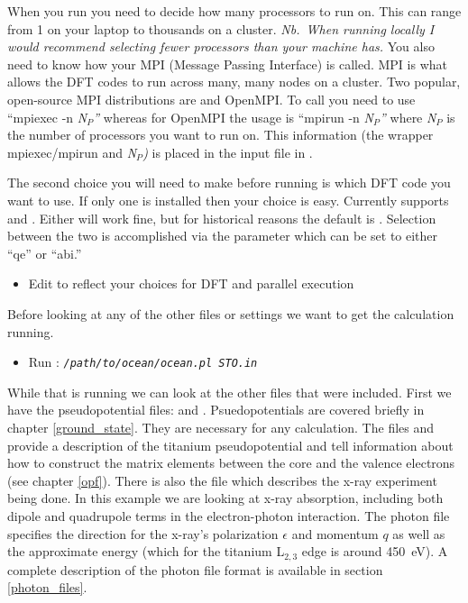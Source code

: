 \documentclass[11pt]{report}
\begin{document}
When you run  you need to decide how many processors to run on. This can range from 1 on your laptop to thousands on a cluster. {\it Nb.\ When running locally I would recommend selecting fewer processors than your machine has.} You also need to know how your MPI (Message Passing Interface) is called. MPI is what allows the DFT codes to run across many, many nodes on a cluster. Two popular, open-source MPI distributions are  and OpenMPI. To call  you need to use ``mpiexec -n {\it N$_P$''} whereas for OpenMPI the usage is ``mpirun -n {\it N$_P$''} where {\it N$_P$} is the number of processors you want to run on. This information (the wrapper mpiexec/mpirun and {\it N$_P$)} is placed in the input file in .

The second choice you will need to make before running is which DFT code you want to use. If only one is installed then your choice is easy. Currently  supports  and . Either will work fine, but for historical reasons the default is . Selection between the two is accomplished via the   parameter which can be set to either ``qe'' or ``abi.''
\begin{itemize}
\item Edit  to reflect your choices for DFT and parallel execution
\end{itemize}
Before looking at any of the other files or settings we want to get the calculation running. 
\begin{itemize}
\item Run : \texttt{\textsl{/path/to/ocean/ocean.pl STO.in}}
\end{itemize}
While that is running we can look at the other files that were included. First we have the pseudopotential files:  and . Psuedopotentials are covered briefly in chapter \ref{ground_state}. They are necessary for any  calculation. The files  and  provide a description of the titanium pseudopotential and tell  information about how to construct the matrix elements between the core and the valence electrons (see chapter \ref{opf}). There is also the file  which describes the x-ray experiment being done. In this example we are looking at x-ray absorption, including both dipole and quadrupole terms in the electron-photon interaction. The photon file specifies the direction for the x-ray's polarization $\epsilon$ and momentum $q$ as well as the 
approximate energy (which for the titanium L$_{2,3}$ edge is around 450~eV). A complete description of the photon file format is available in section \ref{photon_files}.
\end{document}
